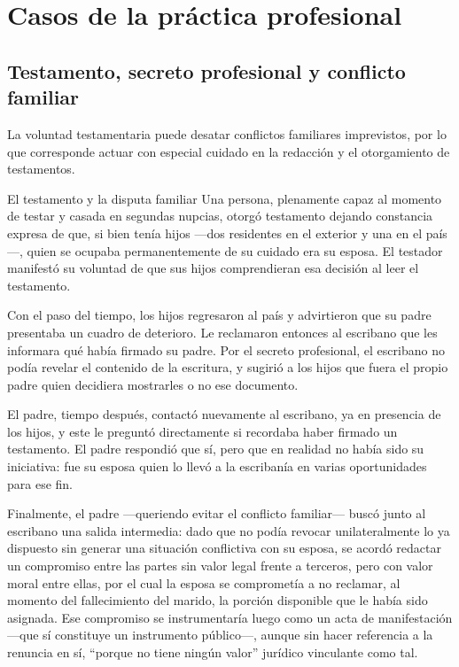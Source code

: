 \documentclass[12pt,oneside]{book}
\begin{document}
\chapter{Casos de la práctica profesional}

\section{Testamento, secreto profesional y conflicto familiar}

La voluntad testamentaria puede desatar conflictos familiares imprevistos, por lo que corresponde actuar con especial cuidado en la redacción y el otorgamiento de testamentos.

\begin{example}{El testamento y la disputa familiar}
Una persona, plenamente capaz al momento de testar y casada en segundas nupcias, otorgó testamento dejando constancia expresa de que, si bien tenía hijos —dos residentes en el exterior y una en el país—, quien se ocupaba permanentemente de su cuidado era su esposa. El testador manifestó su voluntad de que sus hijos comprendieran esa decisión al leer el testamento.

Con el paso del tiempo, los hijos regresaron al país y advirtieron que su padre presentaba un cuadro de deterioro. Le reclamaron entonces al escribano que les informara qué había firmado su padre. Por el secreto profesional, el escribano no podía revelar el contenido de la escritura, y sugirió a los hijos que fuera el propio padre quien decidiera mostrarles o no ese documento.

El padre, tiempo después, contactó nuevamente al escribano, ya en presencia de los hijos, y este le preguntó directamente si recordaba haber firmado un testamento. El padre respondió que sí, pero que en realidad no había sido su iniciativa: fue su esposa quien lo llevó a la escribanía en varias oportunidades para ese fin.

Finalmente, el padre —queriendo evitar el conflicto familiar— buscó junto al escribano una salida intermedia: dado que no podía revocar unilateralmente lo ya dispuesto sin generar una situación conflictiva con su esposa, se acordó redactar un compromiso entre las partes sin valor legal frente a terceros, pero con valor moral entre ellas, por el cual la esposa se comprometía a no reclamar, al momento del fallecimiento del marido, la porción disponible que le había sido asignada. Ese compromiso se instrumentaría luego como un acta de manifestación —que sí constituye un instrumento público—, aunque sin hacer referencia a la renuncia en sí, ``porque no tiene ningún valor'' jurídico vinculante como tal.
\end{example}
\end{document}
